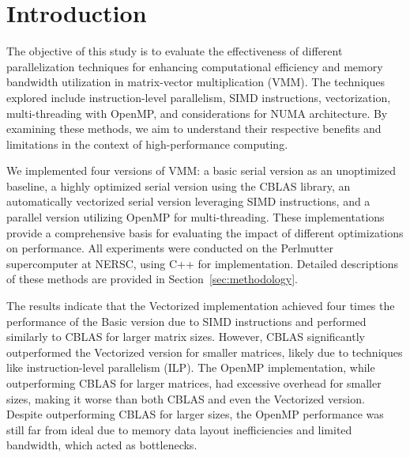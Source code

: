 \section{Introduction}

The objective of this study is to evaluate the effectiveness of different parallelization techniques for enhancing computational efficiency and memory bandwidth utilization in matrix-vector multiplication (VMM). The techniques explored include instruction-level parallelism, SIMD instructions, vectorization, multi-threading with OpenMP, and considerations for NUMA architecture. By examining these methods, we aim to understand their respective benefits and limitations in the context of high-performance computing.

We implemented four versions of VMM: a basic serial version as an unoptimized baseline, a highly optimized serial version using the CBLAS library, an automatically vectorized serial version leveraging SIMD instructions, and a parallel version utilizing OpenMP for multi-threading. These implementations provide a comprehensive basis for evaluating the impact of different optimizations on performance. All experiments were conducted on the Perlmutter supercomputer at NERSC, using C++ for implementation. Detailed descriptions of these methods are provided in Section~\ref{sec:methodology}.

The results indicate that the Vectorized implementation achieved four times the performance of the Basic version due to SIMD instructions and performed similarly to CBLAS for larger matrix sizes. However, CBLAS significantly outperformed the Vectorized version for smaller matrices, likely due to techniques like instruction-level parallelism (ILP). The OpenMP implementation, while outperforming CBLAS for larger matrices, had excessive overhead for smaller sizes, making it worse than both CBLAS and even the Vectorized version. Despite outperforming CBLAS for larger sizes, the OpenMP performance was still far from ideal due to memory data layout inefficiencies and limited bandwidth, which acted as bottlenecks.




